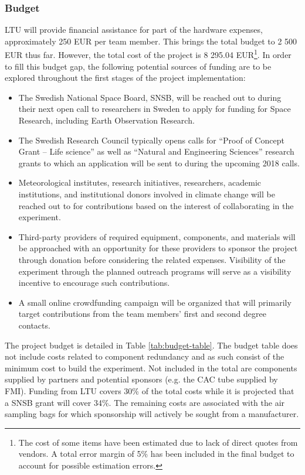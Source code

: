\pagebreak
\subsubsection{Budget}
LTU will provide financial assistance for part of the hardware expenses, approximately 250 EUR per team member. This brings the total budget to 2 500 EUR thus far. However, the total cost of the project is 8 295.04 EUR\footnote{The cost of some items have been estimated due to lack of direct quotes from vendors. A total error margin of 5\% has been included in the final budget to account for possible estimation errors.}. In order to fill this budget gap, the following potential sources of funding are to be explored throughout the first stages of the project implementation:

\begin{itemize}
    \item The Swedish National Space Board, SNSB, will be reached out to during their next open call to researchers in Sweden to apply for funding for Space Research, including Earth Observation Research.
    \item The Swedish Research Council typically opens calls for \enquote{Proof of Concept Grant – Life science} as well as \enquote{Natural and Engineering Sciences} research grants to which an application will be sent to during the upcoming 2018 calls.
    \item Meteorological institutes, research initiatives, researchers, academic institutions, and institutional donors involved in climate change will be reached out to for contributions based on the interest of collaborating in the experiment.
    \item Third-party providers of required equipment, components, and materials will be approached with an opportunity for these providers to sponsor the project through donation before considering the related expenses. Visibility of the experiment through the planned outreach programs will serve as a visibility incentive to encourage such contributions.
    \item A small online crowdfunding campaign will be organized that will primarily target contributions from the team members' first and second degree contacts.
\end{itemize}

The project budget is detailed in Table \ref{tab:budget-table}. The budget table does not include costs related to component redundancy and as such consist of the minimum cost to build the experiment. Not included in the total are components supplied by partners and potential sponsors (e.g. the CAC tube supplied by FMI). Funding from LTU covers 30\% of the total costs while it is projected that a SNSB grant will cover 34\%. The remaining costs are associated with the air sampling bags for which sponsorship will actively be sought from a manufacturer.

